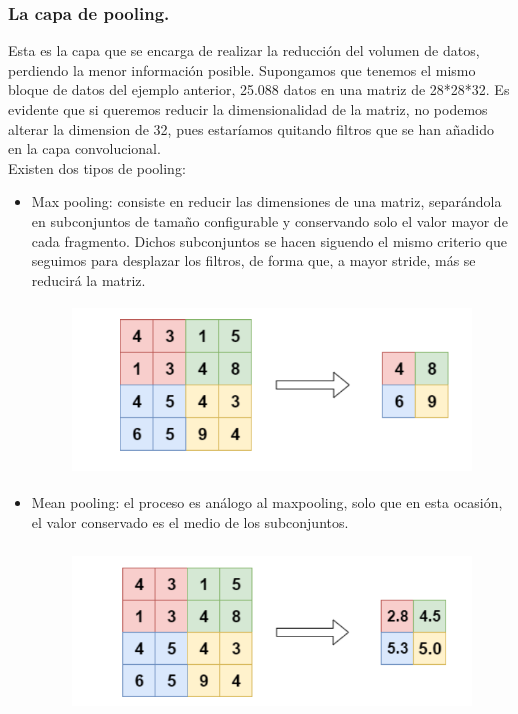 \documentclass[a4paper,10pt]{article}
\begin{document}
\subsubsection{La capa de pooling.}
Esta es la capa que se encarga de realizar la reducción del volumen de datos, perdiendo la menor información posible. Supongamos que tenemos el mismo bloque de datos del ejemplo anterior, 25.088 datos en una matriz de 28*28*32. Es evidente que si queremos reducir la dimensionalidad de la matriz, no podemos alterar la dimension de 32, pues estaríamos quitando filtros que se han añadido en la capa convolucional.\\
Existen dos tipos de pooling:
\begin{itemize}
\item Max pooling: consiste en reducir las dimensiones de una matriz, separándola en subconjuntos de tamaño configurable y conservando solo el valor mayor de cada fragmento. Dichos subconjuntos se hacen siguendo el mismo criterio que seguimos para desplazar los filtros, de forma que, a mayor stride, más se reducirá la matriz.
\begin{figure}[H]
\centering
\includegraphics[width=11.0cm, height=4.5cm]{maxpool.png}
\end{figure}
\item Mean pooling: el proceso es análogo al maxpooling, solo que en esta ocasión, el valor conservado es el medio de los subconjuntos.
\begin{figure}[H]
\centering
\includegraphics[width=11.0cm, height=4.5cm]{meanpool.png}
\end{figure}
\end{itemize}
\end{document}
